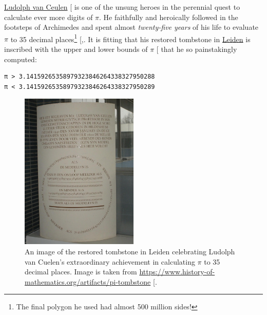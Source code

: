 \documentclass[
  a4paper,
]{article}
\begin{document}
\href{https://en.wikipedia.org/wiki/Ludolph_van_Ceulen}{Ludolph van
Ceulen} {[}\citeproc{ref-van-ceulen}{11}{]} is one of the unsung heroes
in the perennial quest to calculate ever more digits of \(\pi\). He
faithfully and heroically followed in the footsteps of Archimedes and
spent almost \emph{twenty-five years} of his life to evaluate \(\pi\) to
35 decimal places\footnote{The final polygon he used had almost 500
  million sides!}
{[},\citeproc{ref-van-ceulen-memorial}{12}{]}.
It is fitting that his restored tombstone in
\href{https://en.wikipedia.org/wiki/Leiden}{Leiden} is inscribed with
the upper and lower bounds of \(\pi\) {[}\citeproc{ref-tombstone}{13}{]}
that he so painstakingly computed:

\begin{verbatim}
π > 3.14159265358979323846264338327950288
π < 3.14159265358979323846264338327950289
\end{verbatim}

\begin{figure}
\centering
\includegraphics[width=0.5\textwidth,height=\textheight]{images/van-ceulen-restored-tombstone.jpg}
\caption{An image of the restored tombstone in Leiden celebrating
Ludolph van Cuelen's extraordinary achievement in calculating \(\pi\) to
35 decimal places. Image is taken from
\url{https://www.history-of-mathematics.org/artifacts/pi-tombstone}
{[}\citeproc{ref-tombstone}{13}{]}.}\label{fig:memorial}
\end{figure}
\end{document}
